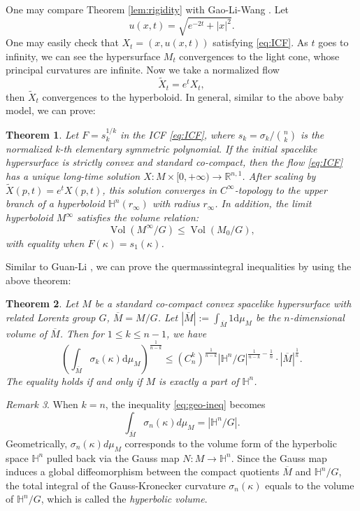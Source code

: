 \documentclass[reqno]{amsart}
\newtheorem{theorem}{Theorem}[section]
\theoremstyle{remark}
\newtheorem{remark}[theorem]{Remark}
\newcommand{\abs}[1]{\left\lvert{#1}\right\rvert}
\newcommand{\dd}{\ensuremath{\text{d}}}
\newcommand{\R}{\ensuremath{\mathbb{R}}}
\renewcommand{\H}{{\mathbb{H}}}
\theoremstyle{definition}
\numberwithin{equation}{section}
\begin{document}
 One may compare Theorem  \ref{lem:rigidity} with Gao-Li-Wang \cite{GaoLiW}. 
Let 
$$u(x,t)=\sqrt{e^{-2t}+|x|^2}.$$  
One may easily check that $X_t=(x,u(x,t))$ satisfying \eqref{eq:ICF}. As $t$ goes to infinity, we can see the hypersurface $M_t$ convergences to the light cone, whose principal curvatures are infinite. Now we take a normalized flow 
$$\tilde{X}_t=e^t X_t,$$   
then $\tilde{X}_t$ convergences to the hyperboloid. In general, similar to the above baby model, we can prove:   

\begin{theorem}\label{thm:convergence}
    Let \(F = s_k^{1/k}\) in the ICF \eqref{eq:ICF}, where \(s_k = {\sigma_k}/{\binom{n}{k}}\) is the normalized k-th elementary symmetric polynomial. If the initial spacelike hypersurface is strictly convex and standard co-compact, then the flow \eqref{eq:ICF} has a unique long-time solution \(X: M\times [0,+\infty)\to \R^{n,1}\). After scaling by \(\tilde{X}(p,t) = e^t X(p,t)\), this solution converges in \(C^{\infty}\)-topology to the upper branch of a hyperboloid \(\H^n(r_\infty)\) with radius \(r_{\infty}\). In addition, the limit hyperboloid \(M^{\infty}\) satisfies the volume relation: 
    \begin{equation*}
        \operatorname{Vol} (M^{\infty}/G) \leq \operatorname{Vol} (M_0/G),
    \end{equation*}
    with equality when \(F(\kappa) = s_1(\kappa)\). 
\end{theorem}


Similar to Guan-Li \cite{Guan2009}, we can prove the quermassintegral inequalities by using the above theorem:
\begin{theorem}\label{thm:quermassintegral_ineq}
    Let \(M\) be a standard co-compact convex spacelike hypersurface with related Lorentz group \(G\), \(\overline{M} = M / G\). Let \(\abs{\overline{M}} := \int_{\overline{M}} 1 \dd \mu_M\) be the \(n\)-dimensional volume of $\overline{M}$. Then for \(1\leq k \leq n-1\), we have
    \begin{equation}\label{eq:geo-ineq}
         {\left( \int_{\overline{M}} \sigma_k(\kappa) \dd \mu_M \right)^{\frac{1}{n-k}}} \leq {(C_n^k)^{\frac{1}{n-k}}\abs{\H^n / G}^{\frac{1}{n-k} - \frac{1}{n}}} \cdot \abs{\overline{M}}^{\frac{1}{n}}.
    \end{equation}
    The equality holds if and only if \(M\) is exactly a part of \(\H^n\). 
\end{theorem}

\begin{remark}
When $k=n$, the inequality \eqref{eq:geo-ineq}  becomes
\begin{equation}
\int_{\overline{M}} \sigma_n(\kappa) d\mu_M = |\mathbb{H}^n/G|.
\end{equation}
Geometrically, $\sigma_n(\kappa)d\mu_M$ corresponds to the volume form of the hyperbolic space $\mathbb{H}^n$ pulled back via the Gauss map $N: M \to \mathbb{H}^n$. Since the Gauss map induces a global diffeomorphism between the compact quotients $\overline{M}$ and $\mathbb{H}^n/G$, the total integral of the Gauss-Kronecker curvature $\sigma_n(\kappa)$ equals to the volume of $\mathbb{H}^n/G$, which is called the {\em hyperbolic volume}.
\end{remark}
\end{document}
